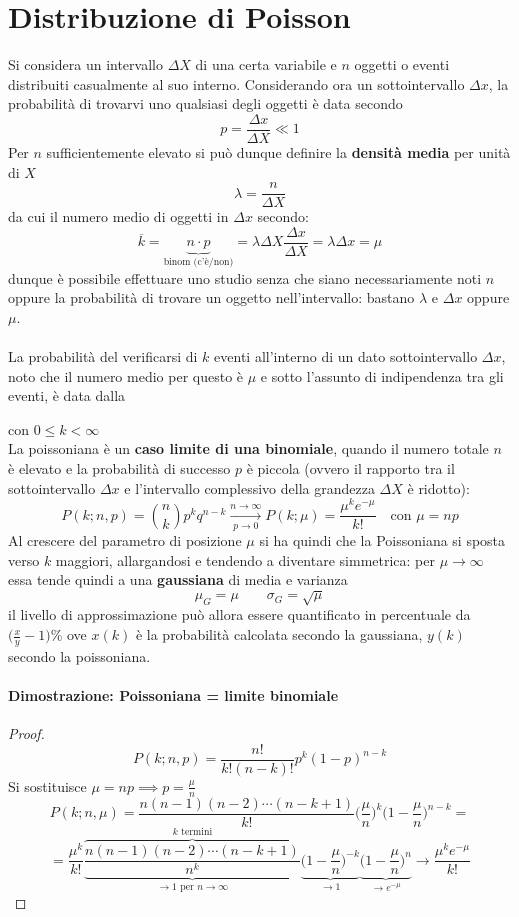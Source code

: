 \documentclass[10pt, oneside]{book}
\newcommand{\lawbox}[2]{\begin{center}
\framebox{
\parbox{\linewidth}{
\vspace{0.3cm}
\textbf{#1} \hfill $\displaystyle #2$
\vspace{0.3cm}
}
}
\end{center}}
\begin{document}
\section{Distribuzione di Poisson}
Si considera un intervallo $\Delta X$ di una certa variabile e $n$ oggetti o eventi distribuiti casualmente al suo interno. Considerando ora un sottointervallo $\Delta x$, la probabilità di trovarvi uno qualsiasi degli oggetti è data secondo
\[p = \frac{\Delta x}{\Delta X} \ll 1\]
Per $n$ sufficientemente elevato si può dunque definire la \textbf{densità media} per unità di $X$
\[\lambda = \frac{n}{\Delta X}\]
da cui il numero medio di oggetti in $\Delta x$ secondo:
\[\overline{k} = \underbrace{n \cdot p}_{\textrm{binom (c'è/non)}} = \lambda \Delta X \frac{\Delta x}{\Delta X} = \lambda \Delta x = \mu\]
dunque è possibile effettuare uno studio senza che siano necessariamente noti $n$ oppure la probabilità di trovare un oggetto nell'intervallo: bastano $\lambda$ e $\Delta x$ oppure $\mu$.\\~\\
La probabilità del verificarsi di $k$ eventi all'interno di un dato sottointervallo $\Delta x$, noto che il numero medio per questo è $\mu$ e sotto l'assunto di indipendenza tra gli eventi, è data dalla
\lawbox{Distribuzione di Poisson}{P(k; \mu) = \frac{\mu^k e^{-\mu}}{k!}}
con $\displaystyle 0 \leq k < \infty$\\La poissoniana è un \textbf{caso limite di una binomiale}, quando il numero totale $n$ è elevato e la probabilità di successo $p$ è piccola (ovvero il rapporto tra il sottointervallo $\Delta x$ e l'intervallo complessivo della grandezza $\Delta X$ è ridotto):
\[P(k; n,p) = \binom{n}{k} p^k q^{n-k} \xrightarrow[p \rightarrow 0]{n \rightarrow \infty} P(k; \mu) = \frac{\mu^k e^{-\mu}}{k!} \quad \textrm{con } \mu = np\]
Al crescere del parametro di posizione $\mu$ si ha quindi che la Poissoniana si sposta verso $k$ maggiori, allargandosi e tendendo a diventare simmetrica: per $\mu \rightarrow \infty$ essa tende quindi a una \textbf{gaussiana} di media e varianza
\[\mu_G = \mu \qquad \sigma_G = \sqrt{\mu}\]
il livello di approssimazione può allora essere quantificato in percentuale da $\displaystyle \big(\frac{x}{y} - 1\big) \%$ ove $x(k)$ è la probabilità calcolata secondo la gaussiana, $y(k)$ secondo la poissoniana.

\paragraph{Dimostrazione: Poissoniana = limite binomiale}
\begin{proof}
\[P(k; n, p) = \frac{n!}{k! (n-k)!} p^k (1-p)^{n-k}\]
Si sostituisce $\displaystyle \mu = np \implies p = \frac{\mu}{n}$
\[P(k; n, \mu) = \frac{n (n-1) (n-2) \cdots (n-k+1)}{k!} \bigg(\frac{\mu}{n}\bigg)^{k} \bigg(1 - \frac{\mu}{n}\bigg)^{n-k} =\]
\[= \frac{\mu^k}{k!} \underbrace{\overbrace{\frac{n (n-1) (n-2) \cdots (n-k + 1)}{n^k}}^{k \textrm{ termini}}}_{\rightarrow 1 \textrm{ per } n \rightarrow \infty} \underbrace{\bigg(1 - \frac{\mu}{n}\bigg)^{-k}}_{\rightarrow 1} \underbrace{\bigg(1 - \frac{\mu}{n}\bigg)^{n}}_{\rightarrow e^{-\mu}} \rightarrow \frac{\mu^k e^{-\mu}}{k!}\]
\end{proof}
\end{document}
